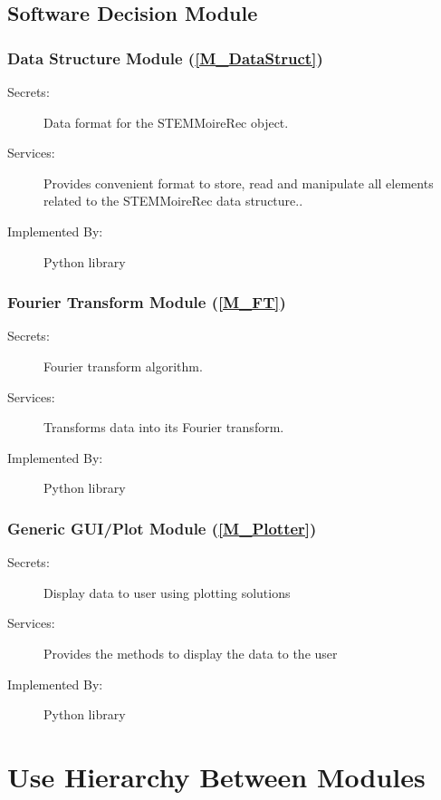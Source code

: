 \documentclass[12pt, titlepage]{article}
\newcommand{\progname}{STEMMoireRec}
\begin{document}
\subsection{Software Decision Module}

\subsubsection{Data Structure Module (\texorpdfstring{\cref{M_DataStruct}}))}
\label{MG_DataStruct}
\begin{description}
\item[Secrets:] Data format for the \progname{} object.
\item[Services:] Provides convenient format to store, read and manipulate all 
elements related to the \progname{} data structure..
\item[Implemented By:] Python library
\end{description}

\subsubsection{Fourier Transform Module (\texorpdfstring{\cref{M_FT}}))}
\label{MG_FT}
\begin{description}
\item[Secrets:] Fourier transform algorithm.
\item[Services:] Transforms data into its Fourier transform.
\item[Implemented By:]Python library
\end{description}


\subsubsection{Generic GUI/Plot Module (\texorpdfstring{\cref{M_Plotter}}))}
\label{MG_Plotter}
\begin{description}
\item[Secrets:] Display data to user using plotting solutions
\item[Services:] Provides the methods to display the data to the user
\item[Implemented By:] Python library
\end{description}

\section{Use Hierarchy Between Modules} \label{SecUse}
\end{document}
